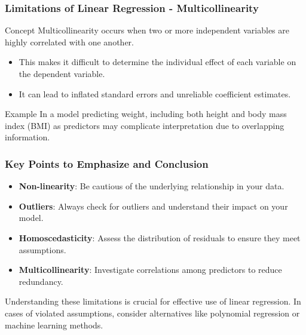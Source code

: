 \documentclass{beamer}
\begin{document}
\begin{frame}[fragile]
    \frametitle{Limitations of Linear Regression - Multicollinearity}
    \begin{block}{Concept}
        Multicollinearity occurs when two or more independent variables are highly correlated with one another.
    \end{block}
    \begin{itemize}
        \item This makes it difficult to determine the individual effect of each variable on the dependent variable.
        \item It can lead to inflated standard errors and unreliable coefficient estimates.
    \end{itemize}
    \begin{block}{Example}
        In a model predicting weight, including both height and body mass index (BMI) as predictors may complicate interpretation due to overlapping information.
    \end{block}
\end{frame}

\begin{frame}[fragile]
    \frametitle{Key Points to Emphasize and Conclusion}
    \begin{itemize}
        \item \textbf{Non-linearity}: Be cautious of the underlying relationship in your data.
        \item \textbf{Outliers}: Always check for outliers and understand their impact on your model.
        \item \textbf{Homoscedasticity}: Assess the distribution of residuals to ensure they meet assumptions.
        \item \textbf{Multicollinearity}: Investigate correlations among predictors to reduce redundancy.
    \end{itemize}
    
    Understanding these limitations is crucial for effective use of linear regression. In cases of violated assumptions, consider alternatives like polynomial regression or machine learning methods.
\end{frame}
\end{document}
